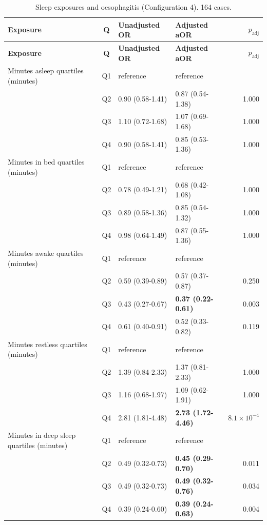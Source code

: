 \documentclass[11pt]{article}
\begin{document}
\begin{longtable}{@{}p{5.2cm}c p{3.0cm} p{3.0cm} r@{}}
\caption{Sleep exposures and oesophagitis (Configuration 4). 164 cases.}\label{tab:res-sleep-eso}\\
\toprule \textbf{Exposure} & \textbf{Q} & \textbf{Unadjusted OR} & \textbf{Adjusted aOR} & \textbf{$p_{\text{adj}}$} \\ \midrule
\endfirsthead \toprule \textbf{Exposure} & \textbf{Q} & \textbf{Unadjusted OR} & \textbf{Adjusted aOR} & \textbf{$p_{\text{adj}}$} \\ \midrule \endhead
Minutes asleep quartiles (minutes) & Q1 & reference & reference & \\
 & Q2 & 0.90 (0.58-1.41) & 0.87 (0.54-1.38) & 1.000 \\
 & Q3 & 1.10 (0.72-1.68) & 1.07 (0.69-1.68) & 1.000 \\
 & Q4 & 0.90 (0.58-1.41) & 0.85 (0.53-1.36) & 1.000 \\
\addlinespace
Minutes in bed quartiles (minutes) & Q1 & reference & reference & \\
 & Q2 & 0.78 (0.49-1.21) & 0.68 (0.42-1.08) & 1.000 \\
 & Q3 & 0.89 (0.58-1.36) & 0.85 (0.54-1.32) & 1.000 \\
 & Q4 & 0.98 (0.64-1.49) & 0.87 (0.55-1.36) & 1.000 \\
\addlinespace
Minutes awake quartiles (minutes) & Q1 & reference & reference & \\
 & Q2 & 0.59 (0.39-0.89) & 0.57 (0.37-0.87) & 0.250 \\
 & Q3 & 0.43 (0.27-0.67) & \textbf{0.37 (0.22-0.61)} & 0.003 \\
 & Q4 & 0.61 (0.40-0.91) & 0.52 (0.33-0.82) & 0.119 \\
\addlinespace
Minutes restless quartiles (minutes) & Q1 & reference & reference & \\
 & Q2 & 1.39 (0.84-2.33) & 1.37 (0.81-2.33) & 1.000 \\
 & Q3 & 1.16 (0.68-1.97) & 1.09 (0.62-1.91) & 1.000 \\
 & Q4 & 2.81 (1.81-4.48) & \textbf{2.73 (1.72-4.46)} & $8.1\times10^{-4}$ \\
\addlinespace
Minutes in deep sleep quartiles (minutes) & Q1 & reference & reference & \\
 & Q2 & 0.49 (0.32-0.73) & \textbf{0.45 (0.29-0.70)} & 0.011 \\
 & Q3 & 0.49 (0.32-0.73) & \textbf{0.49 (0.32-0.76)} & 0.034 \\
 & Q4 & 0.39 (0.24-0.60) & \textbf{0.39 (0.24-0.63)} & 0.004 \\

\end{longtable}
\end{document}
